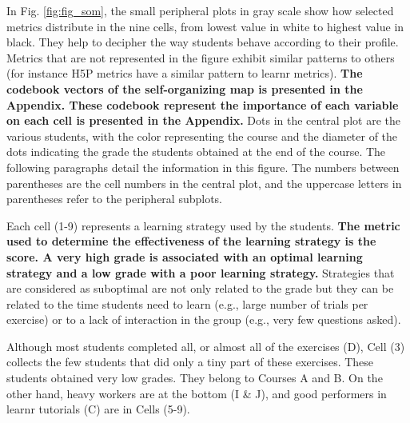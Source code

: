\documentclass{aims}
\theoremstyle{definition}
\begin{document}
In Fig. \ref {fig:fig_som}, the small peripheral plots in gray scale
show how selected metrics distribute in the nine cells, from lowest
value in white to highest value in black. They help to decipher the way
students behave according to their profile. Metrics that are not
represented in the figure exhibit similar patterns to others (for
instance H5P metrics have a similar pattern to learnr metrics).
\textbf{The codebook vectors of the self-organizing map is presented in
the Appendix. These codebook represent the importance of each variable
on each cell is presented in the Appendix.} Dots in the central plot are
the various students, with the color representing the course and the
diameter of the dots indicating the grade the students obtained at the
end of the course. The following paragraphs detail the information in
this figure. The numbers between parentheses are the cell numbers in the
central plot, and the uppercase letters in parentheses refer to the
peripheral subplots.

Each cell (1-9) represents a learning strategy used by the students.
\textbf{The metric used to determine the effectiveness of the learning
strategy is the score. A very high grade is associated with an optimal
learning strategy and a low grade with a poor learning strategy.}
Strategies that are considered as suboptimal are not only related to the
grade but they can be related to the time students need to learn (e.g.,
large number of trials per exercise) or to a lack of interaction in the
group (e.g., very few questions asked).

Although most students completed all, or almost all of the exercises
(D), Cell (3) collects the few students that did only a tiny part of
these exercises. These students obtained very low grades. They belong to
Courses A and B. On the other hand, heavy workers are at the bottom (I
\& J), and good performers in learnr tutorials (C) are in Cells (5-9).
\end{document}
